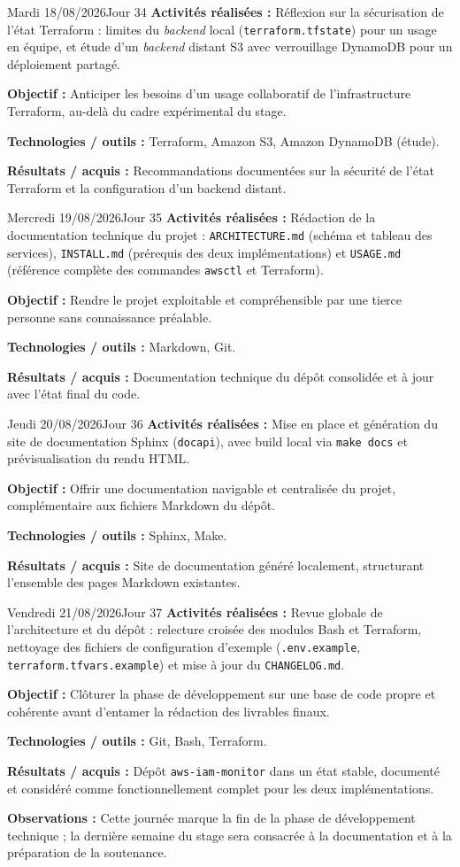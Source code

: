 \documentclass[11pt,a4paper]{article}
\newcommand{\journalfield}[2]{{\color{primaryblue}\textbf{#1 :}} #2\par\smallskip}
\begin{document}
\begin{journalday}{Mardi 18/08/2026}{Jour 34}
\journalfield{Activités réalisées}{Réflexion sur la sécurisation de l'état Terraform : limites du \textit{backend} local (\texttt{terraform.tfstate}) pour un usage en équipe, et étude d'un \textit{backend} distant S3 avec verrouillage DynamoDB pour un déploiement partagé.}
\journalfield{Objectif}{Anticiper les besoins d'un usage collaboratif de l'infrastructure Terraform, au-delà du cadre expérimental du stage.}
\journalfield{Technologies / outils}{Terraform, Amazon S3, Amazon DynamoDB (étude).}
\journalfield{Résultats / acquis}{Recommandations documentées sur la sécurité de l'état Terraform et la configuration d'un backend distant.}
\end{journalday}

\begin{journalday}{Mercredi 19/08/2026}{Jour 35}
\journalfield{Activités réalisées}{Rédaction de la documentation technique du projet : \texttt{ARCHITECTURE.md} (schéma et tableau des services), \texttt{INSTALL.md} (prérequis des deux implémentations) et \texttt{USAGE.md} (référence complète des commandes \texttt{awsctl} et Terraform).}
\journalfield{Objectif}{Rendre le projet exploitable et compréhensible par une tierce personne sans connaissance préalable.}
\journalfield{Technologies / outils}{Markdown, Git.}
\journalfield{Résultats / acquis}{Documentation technique du dépôt consolidée et à jour avec l'état final du code.}
\end{journalday}

\begin{journalday}{Jeudi 20/08/2026}{Jour 36}
\journalfield{Activités réalisées}{Mise en place et génération du site de documentation Sphinx (\texttt{docapi}), avec build local via \texttt{make docs} et prévisualisation du rendu HTML.}
\journalfield{Objectif}{Offrir une documentation navigable et centralisée du projet, complémentaire aux fichiers Markdown du dépôt.}
\journalfield{Technologies / outils}{Sphinx, Make.}
\journalfield{Résultats / acquis}{Site de documentation généré localement, structurant l'ensemble des pages Markdown existantes.}
\end{journalday}

\begin{journalday}{Vendredi 21/08/2026}{Jour 37}
\journalfield{Activités réalisées}{Revue globale de l'architecture et du dépôt : relecture croisée des modules Bash et Terraform, nettoyage des fichiers de configuration d'exemple (\texttt{.env.example}, \texttt{terraform.tfvars.example}) et mise à jour du \texttt{CHANGELOG.md}.}
\journalfield{Objectif}{Clôturer la phase de développement sur une base de code propre et cohérente avant d'entamer la rédaction des livrables finaux.}
\journalfield{Technologies / outils}{Git, Bash, Terraform.}
\journalfield{Résultats / acquis}{Dépôt \texttt{aws-iam-monitor} dans un état stable, documenté et considéré comme fonctionnellement complet pour les deux implémentations.}
\journalfield{Observations}{Cette journée marque la fin de la phase de développement technique ; la dernière semaine du stage sera consacrée à la documentation et à la préparation de la soutenance.}
\end{journalday}
\end{document}
